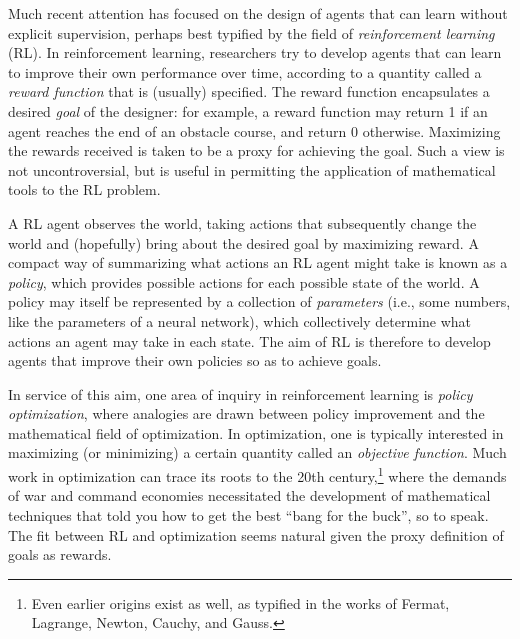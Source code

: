 \documentclass[\main/thesis.tex]{subfiles}
\begin{document}

Much recent attention has focused on the design of agents that can learn without explicit supervision, perhaps best typified by the field of \textit{reinforcement learning} (RL). In reinforcement learning, researchers try to develop agents that can learn to improve their own performance over time, according to a quantity called a \textit{reward function} that is (usually) specified.%
The reward function encapsulates a desired \textit{goal} of the designer: for example, a reward function may return 1 if an agent reaches the end of an obstacle course, and return 0 otherwise. Maximizing the rewards received is taken to be a proxy for achieving the goal. Such a view is not uncontroversial, but is useful in permitting the application of mathematical tools to the RL problem. 

A RL agent observes the world, taking actions that subsequently change the world and (hopefully) bring about the desired goal by maximizing reward. A compact way of summarizing what actions an RL agent might take is known as a \textit{policy}, which provides possible actions for each possible state of the world. A policy may itself be represented by a collection of \textit{parameters} (i.e., some numbers, like the parameters of a neural network), which collectively determine what actions an agent may take in each state. The aim of RL is therefore to develop agents that improve their own policies so as to achieve goals. 


In service of this aim, one area of inquiry in reinforcement learning is \textit{policy optimization}, where analogies are drawn between policy improvement and the mathematical field of optimization. In optimization, one is typically interested in maximizing (or minimizing) a certain quantity called an \textit{objective function}. Much work in optimization can trace its roots to the 20th century,\footnote{Even earlier origins exist as well, as typified in the works of Fermat, Lagrange, Newton, Cauchy, and Gauss.} where the demands of war and command economies necessitated the development of mathematical techniques that told you how to get the best ``bang for the buck'', so to speak. The fit between RL and optimization seems natural given the proxy definition of goals as rewards. 
\end{document}
